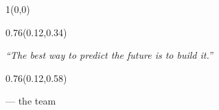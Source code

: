 \documentclass[aspectratio=169]{beamer}
\begin{document}
\begin{frame}[t]

%
\begin{textblock}{1}(0,0)
\end{textblock}

\begin{textblock}{0.76}(0.12,0.34)
{\centering\fontsize{28}{34}\selectfont \textcolor[HTML]{2E6B30}{\textit{“The best way to predict the future is to build it.”}}\par}
\end{textblock}

\begin{textblock}{0.76}(0.12,0.58)
{\centering\fontsize{16}{19}\selectfont \textcolor[HTML]{555555}{— the team}\par}
\end{textblock}
\end{frame}
\end{document}
